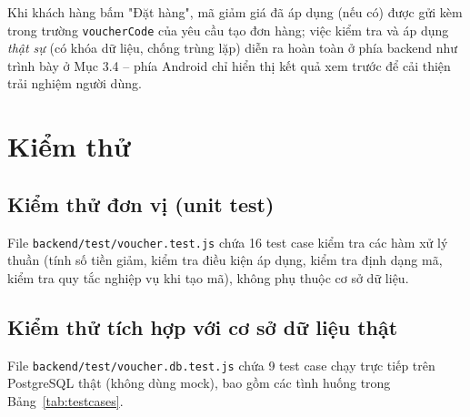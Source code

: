 \documentclass[12pt,a4paper]{article}
\begin{document}
Khi khách hàng bấm "Đặt hàng", mã giảm giá đã áp dụng (nếu có) được gửi kèm trong trường \texttt{voucherCode} của yêu cầu tạo đơn hàng; việc kiểm tra và áp dụng \emph{thật sự} (có khóa dữ liệu, chống trùng lặp) diễn ra hoàn toàn ở phía backend như trình bày ở Mục 3.4 -- phía Android chỉ hiển thị kết quả xem trước để cải thiện trải nghiệm người dùng.

\section{Kiểm thử}

\subsection{Kiểm thử đơn vị (unit test)}

File \texttt{backend/test/voucher.test.js} chứa 16 test case kiểm tra các hàm xử lý thuần (tính số tiền giảm, kiểm tra điều kiện áp dụng, kiểm tra định dạng mã, kiểm tra quy tắc nghiệp vụ khi tạo mã), không phụ thuộc cơ sở dữ liệu.

\subsection{Kiểm thử tích hợp với cơ sở dữ liệu thật}
\label{sec:test-race}

File \texttt{backend/test/voucher.db.test.js} chứa 9 test case chạy trực tiếp trên PostgreSQL thật (không dùng mock), bao gồm các tình huống trong Bảng~\ref{tab:testcases}.
\end{document}
